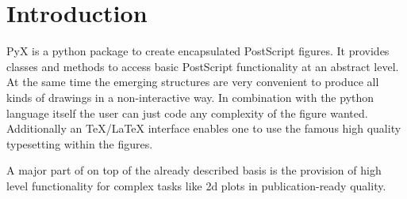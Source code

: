 \chapter{Introduction}
\label{intro}
PyX is a python package to create encapsulated PostScript figures. It
provides classes and methods to access basic PostScript functionality
at an abstract level. At the same time the emerging structures are
very convenient to produce all kinds of drawings in a non-interactive
way. In combination with the python language itself the user can just
code any complexity of the figure wanted. Additionally an
\TeX{}/\LaTeX{} interface enables one to use the famous high quality
typesetting within the figures.

A major part of \PyX{} on top of the already described basis is the
provision of high level functionality for complex tasks like 2d plots
in publication-ready quality.
